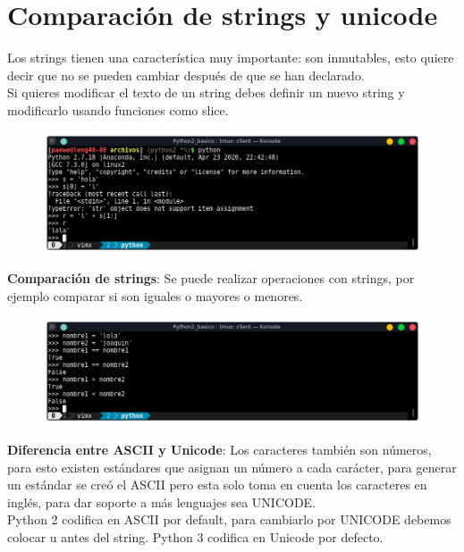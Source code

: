 \documentclass{article}
\begin{document}
\section{Comparación de strings y unicode}%
Los strings tienen una característica muy importante: son inmutables, esto
quiere decir que no se pueden cambiar después de que se han declarado.\\

Si quieres modificar el texto de un string debes definir un nuevo string y
modificarlo usando funciones como slice.

\begin{figure}[h!]
  \centering
  \includegraphics[scale=0.75]{./Pictures/001_string_inmutable.png}
\end{figure}

\textbf{Comparación de strings}: Se puede realizar operaciones con strings, por
ejemplo comparar si son iguales o mayores o menores.

\begin{figure}[h!]
  \centering
  \includegraphics[scale=0.75]{./Pictures/002_comparar_strings.png}
\end{figure}

\textbf{Diferencia entre ASCII y Unicode}: Los caracteres también son números,
para esto existen estándares que asignan un número a cada carácter, para
generar un estándar se creó el ASCII pero esta solo toma en cuenta los
caracteres en inglés, para dar soporte a más lenguajes sea UNICODE.\\

Python 2 codifica en ASCII por default, para cambiarlo por UNICODE debemos
colocar u antes del string. Python 3 codifica en Unicode por defecto.
\end{document}
